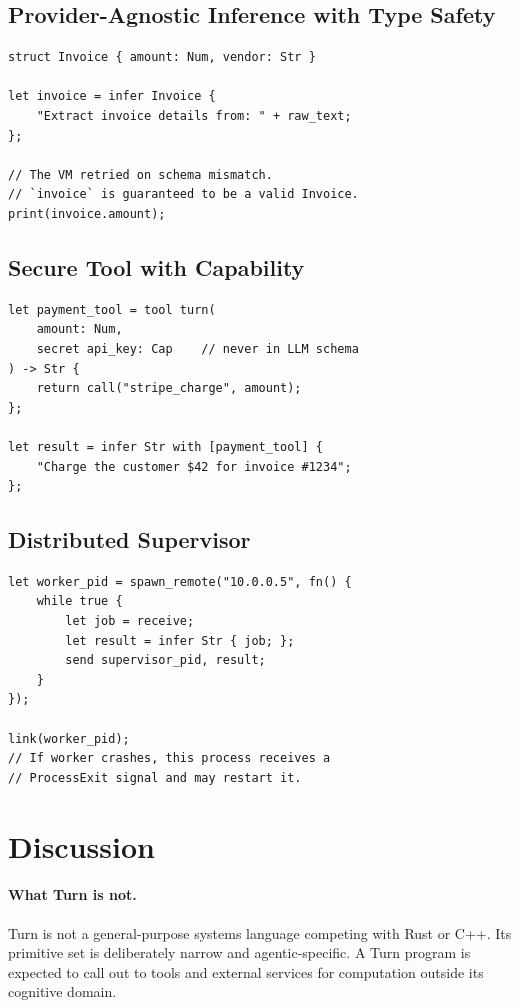 \documentclass[sigplan,10pt,review,anonymous]{acmart}
\begin{document}
\subsection{Provider-Agnostic Inference with Type Safety}

\begin{lstlisting}
struct Invoice { amount: Num, vendor: Str }

let invoice = infer Invoice {
    "Extract invoice details from: " + raw_text;
};

// The VM retried on schema mismatch.
// `invoice` is guaranteed to be a valid Invoice.
print(invoice.amount);
\end{lstlisting}

\subsection{Secure Tool with Capability}

\begin{lstlisting}
let payment_tool = tool turn(
    amount: Num,
    secret api_key: Cap    // never in LLM schema
) -> Str {
    return call("stripe_charge", amount);
};

let result = infer Str with [payment_tool] {
    "Charge the customer $42 for invoice #1234";
};
\end{lstlisting}

\subsection{Distributed Supervisor}

\begin{lstlisting}
let worker_pid = spawn_remote("10.0.0.5", fn() {
    while true {
        let job = receive;
        let result = infer Str { job; };
        send supervisor_pid, result;
    }
});

link(worker_pid);
// If worker crashes, this process receives a
// ProcessExit signal and may restart it.
\end{lstlisting}

\section{Discussion}

\paragraph{What Turn is not.}
Turn is not a general-purpose systems language competing with Rust or C++.
Its primitive set is deliberately narrow and agentic-specific. A Turn program
is expected to call out to tools and external services for computation outside
its cognitive domain.
\end{document}
